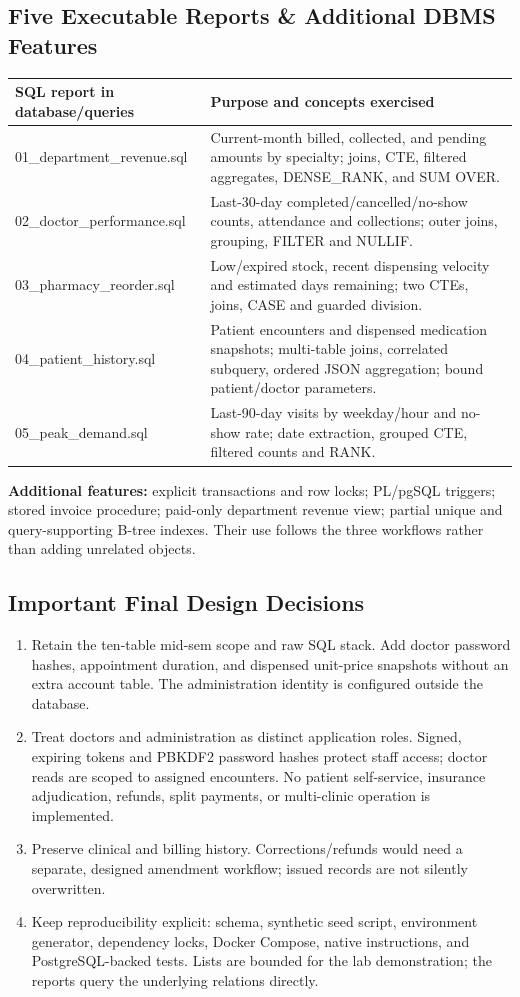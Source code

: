 \documentclass[10pt,a4paper]{article}
\begin{document}
\subsection{Five Executable Reports \& Additional DBMS Features}
{\small
\begin{tabularx}{\linewidth}{@{}>{\raggedright\arraybackslash\footnotesize}p{3.8cm}>{\raggedright\arraybackslash}X@{}}
\toprule \textbf{SQL report in database/queries} & \textbf{Purpose and concepts exercised}\\\midrule
01\_department\_revenue.sql & Current-month billed, collected, and pending amounts by specialty; joins, CTE, filtered aggregates, DENSE\_RANK, and SUM OVER.\\
02\_doctor\_performance.sql & Last-30-day completed/cancelled/no-show counts, attendance and collections; outer joins, grouping, FILTER and NULLIF.\\
03\_pharmacy\_reorder.sql & Low/expired stock, recent dispensing velocity and estimated days remaining; two CTEs, joins, CASE and guarded division.\\
04\_patient\_history.sql & Patient encounters and dispensed medication snapshots; multi-table joins, correlated subquery, ordered JSON aggregation; bound patient/doctor parameters.\\
05\_peak\_demand.sql & Last-90-day visits by weekday/hour and no-show rate; date extraction, grouped CTE, filtered counts and RANK.\\\bottomrule
\end{tabularx}}
\textbf{Additional features:} explicit transactions and row locks; PL/pgSQL triggers; stored invoice procedure; paid-only department revenue view; partial unique and query-supporting B-tree indexes. Their use follows the three workflows rather than adding unrelated objects.

\subsection{Important Final Design Decisions}
\begin{enumerate}
\item Retain the ten-table mid-sem scope and raw SQL stack. Add doctor password hashes, appointment duration, and dispensed unit-price snapshots without an extra account table. The administration identity is configured outside the database.
\item Treat doctors and administration as distinct application roles. Signed, expiring tokens and PBKDF2 password hashes protect staff access; doctor reads are scoped to assigned encounters. No patient self-service, insurance adjudication, refunds, split payments, or multi-clinic operation is implemented.
\item Preserve clinical and billing history. Corrections/refunds would need a separate, designed amendment workflow; issued records are not silently overwritten.
\item Keep reproducibility explicit: schema, synthetic seed script, environment generator, dependency locks, Docker Compose, native instructions, and PostgreSQL-backed tests. Lists are bounded for the lab demonstration; the reports query the underlying relations directly.
\end{enumerate}
\end{document}
